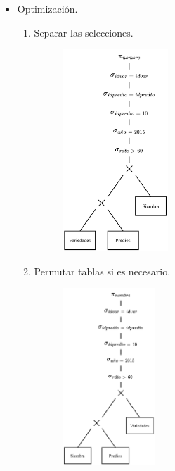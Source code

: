 \documentclass{templateNote}
\begin{document}
\begin{enumerate}
\begin{itemize}
        \item Optimizaci\'on.
        \begin{enumerate}
            \item Separar las selecciones.
            \begin{figure}[H]
                \centering
                \includegraphics[width=0.4\textwidth]{img/E1-Paso-1.png}
            \end{figure}

            \newpage
            \item Permutar tablas si es necesario.
            \begin{figure}[H]
                \centering
                \includegraphics[width=0.35\textwidth]{img/E1-Paso-2.png}
            \end{figure}


\end{enumerate}
\end{itemize}
\end{enumerate}
\end{document}
